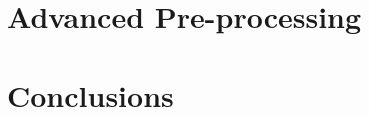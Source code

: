 \documentclass[12pt]{article}
\begin{document}




\section{Advanced Pre-processing}

\section{Conclusions}







\newpage



\end{document}
